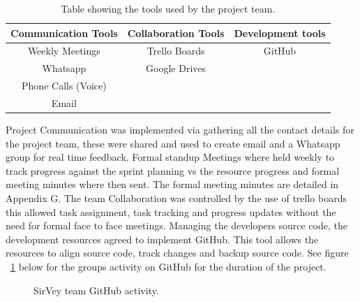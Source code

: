 \documentclass[12pt]{witseiepaper}
\begin{document}
\begin{table}[htb] \caption{Table showing the tools used by the project team.} \label{tbl:Tools} 
	\begin{center}
		\begin{tabular}
			{|c|c|c|} %
			\hline Communication Tools & Collaboration Tools & Development tools \\
			\hline Weekly Meetings &  Trello Boards & GitHub\\
			\hline Whatsapp & Google Drives &\\
			\hline Phone Calls (Voice) &&\\
			\hline Email &&\\
			\hline 
		\end{tabular}
	\end{center}
\end{table}

Project Communication was implemented via gathering all the contact details for the project team, these were shared and used to create email and a Whatsapp group for real time feedback. Formal standup Meetings where held weekly to track progress against the sprint planning vs the resource progress and formal meeting minutes where then sent. The formal meeting minutes are detailed in Appendix G. The team Collaboration was controlled by the use of trello boards \cite{Trello} this allowed task assignment, task tracking and progress updates without the need for formal face to face meetings. Managing the developers source code, the development resources agreed to implement GitHub.\cite{GitHubRef} This tool allows the resources to align source code, track changes and backup source code. See figure ~\ref{fig:Checkin} below for the groups activity on GitHub for the duration of the project.

\begin{figure}[H]
	\caption{SirVey team GitHub activity.} 
	\label{fig:Checkin}
\end{figure}
 
\end{document}
